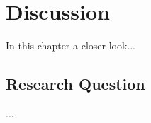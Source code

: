 \chapter{Discussion}
\label{disc}

\minitoc

In this chapter a closer look...
\newpage

\section{Research Question}


\begin{fancyquotes}
...
\end{fancyquotes}